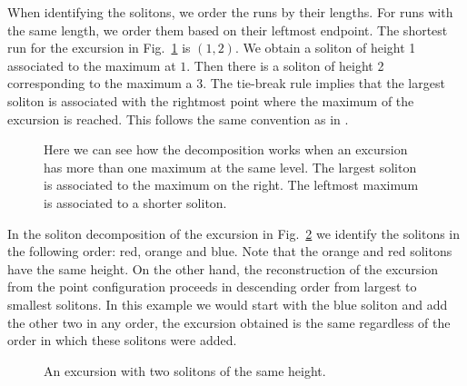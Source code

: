 \documentclass[12pt]{article}
\numberwithin{equation}{section}
\begin{document}
When identifying the solitons, we order the runs by their lengths. For runs with the same length, we order them based on their leftmost endpoint.
The shortest run for the excursion in Fig.~\ref{ex1} is $(1,2)$.
We obtain a soliton of height 1 associated to the maximum at $1$. Then there is a soliton of height 2 corresponding to the maximum a 3. 
The tie-break rule implies that the largest soliton is associated with the rightmost point where the maximum of the excursion is reached.
This follows the same convention as in \cite{FNRW}.


\begin{figure}[ht]
\centering
{}
\caption{Here we can see how the decomposition works when an excursion has more than one maximum at the same level. The largest soliton is associated to the maximum on the right. The leftmost maximum is associated to a shorter soliton.}
\label{ex1}
\end{figure}


In the soliton decomposition of the excursion  in Fig.~\ref{ex2} we identify the solitons in the following order: red, orange and blue.
Note that the orange and red solitons have the same height.
On the other hand, the reconstruction of the excursion from the point configuration proceeds in descending order from largest to smallest solitons. In this example we would start with the blue soliton and add the other two in any order,
the excursion obtained is the same regardless of the order in which these solitons were added.

\begin{figure}[ht]
\centering
{}
\caption{An excursion with two solitons of the same height.}
\label{ex2}
\end{figure}
\end{document}
